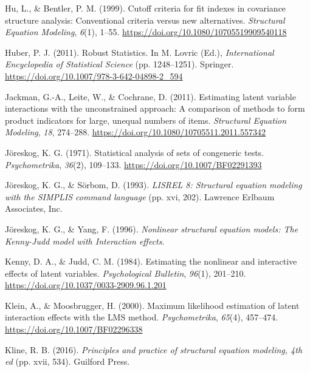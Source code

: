 \documentclass[
  man]{apa6}
\newlength{\cslhangindent}
\newenvironment{CSLReferences}[2] %
 {\begin{list}{}{%
  \setlength{\itemindent}{0pt}
  \setlength{\leftmargin}{0pt}
  \setlength{\parsep}{0pt}
  \ifodd #1
   \setlength{\leftmargin}{\cslhangindent}
   \setlength{\itemindent}{-1\cslhangindent}
  \fi
  \setlength{\itemsep}{#2\baselineskip}}}
 {\end{list}}
\begin{document}
\begin{CSLReferences}{1}{0}
Hu, L., \& Bentler, P. M. (1999). Cutoff criteria for fit indexes in covariance structure analysis: {Conventional} criteria versus new alternatives. \emph{Structural Equation Modeling}, \emph{6}(1), 1--55. \url{https://doi.org/10.1080/10705519909540118}

Huber, P. J. (2011). Robust {Statistics}. In M. Lovric (Ed.), \emph{International {Encyclopedia} of {Statistical Science}} (pp. 1248--1251). Springer. \url{https://doi.org/10.1007/978-3-642-04898-2_594}

Jackman, G.-A., Leite, W., \& Cochrane, D. (2011). Estimating latent variable interactions with the unconstrained approach: {A} comparison of methods to form product indicators for large, unequal numbers of items. \emph{Structural Equation Modeling}, \emph{18}, 274--288. \url{https://doi.org/10.1080/10705511.2011.557342}

Jöreskog, K. G. (1971). Statistical analysis of sets of congeneric tests. \emph{Psychometrika}, \emph{36}(2), 109--133. \url{https://doi.org/10.1007/BF02291393}

Jöreskog, K. G., \& Sörbom, D. (1993). \emph{{LISREL} 8: {Structural} equation modeling with the {SIMPLIS} command language} (pp. xvi, 202). Lawrence Erlbaum Associates, Inc.

Jöreskog, K. G., \& Yang, F. (1996). \emph{Nonlinear structural equation models: {The Kenny-Judd} model with {Interaction} effects}.

Kenny, D. A., \& Judd, C. M. (1984). Estimating the nonlinear and interactive effects of latent variables. \emph{Psychological Bulletin}, \emph{96}(1), 201--210. \url{https://doi.org/10.1037/0033-2909.96.1.201}

Klein, A., \& Moosbrugger, H. (2000). Maximum likelihood estimation of latent interaction effects with the {LMS} method. \emph{Psychometrika}, \emph{65}(4), 457--474. \url{https://doi.org/10.1007/BF02296338}

Kline, R. B. (2016). \emph{Principles and practice of structural equation modeling, 4th ed} (pp. xvii, 534). Guilford Press.


\end{CSLReferences}
\end{document}
